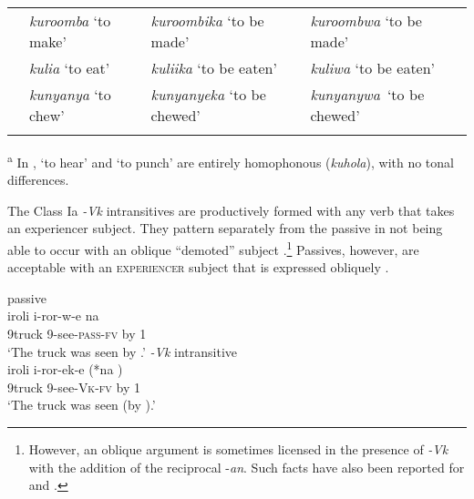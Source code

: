 \documentclass[output=paper]{langsci/lanmgscibook}
\begin{document}
\begin{table}
\begin{tabularx}{\textwidth}{lp{2.5cm}XX}
\tablevspace & \textit{kuroomba} \newline ‘to make’ & \textit{kuroombika} \newline ‘to be made’ & \textit{kuroombwa} \newline ‘to be made’\\
\tablevspace & \textit{kulia} \newline ‘to eat’ & \textit{kuliika} \newline ‘to be eaten’ & \textit{kuliwa} \newline ‘to be eaten’\\
\tablevspace & \textit{kunyanya} \newline ‘to chew’ & \textit{kunyanyeka} \newline ‘to be chewed’ & \textit{kunyanywa}~\newline ‘to be chewed’\\ 
\lspbottomrule
\end{tabularx}
\textsuperscript{a} In , ‘to hear’ and ‘to punch’ are entirely homophonous (\textit{kuhola}), with no tonal differences.

\end{table}

The Class Ia \textit{-Vk} intransitives are productively formed with any verb that takes an experiencer subject. They pattern separately from the passive in not being able to occur with an oblique “demoted” subject .\footnote{However, an oblique argument is sometimes licensed in the presence of \textit{-Vk} with the addition of the reciprocal -\textit{an}. Such facts have also been reported for  and  \citep{Dubinsky1996,SeidlDimitriadis2003}.} Passives, however, are acceptable with an \textsc{experiencer} subject that is expressed obliquely .

\ea\label{ex:gluckman:18}
  \ea \label{ex:gluckman:18a}
  {{passive}}\\
  \gll iroli      i-ror-w-e         na \\
      9truck  9-see-\textsc{pass-fv} by 1\\
  \glt ‘The truck was seen by .’ 
  \ex\label{ex:gluckman:18b}
  {{\textit{-Vk}}{ intransitive}}\\
  \gll iroli    i-ror-ek-e       (*na )\\
      9truck 9-see-\textsc{Vk}\textsc{-}\textsc{fv}   \hphantom{(*}by 1\\
  \glt ‘The truck was seen (by ).’
  \z
\z
\end{document}
